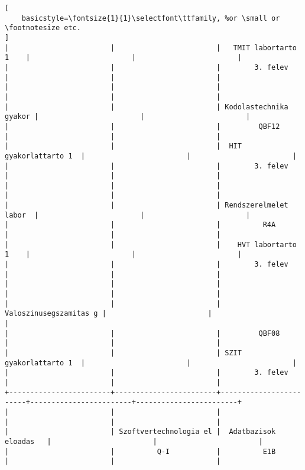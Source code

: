 \begin{lstlisting}[
    basicstyle=\fontsize{1}{1}\selectfont\ttfamily, %or \small or \footnotesize etc.
]
|                        |                        |   TMIT labortarto 1    |                        |                        | 
|                        |                        |        3. felev        |                        |                        | 
|                        |                        |                        |                        |                        | 
|                        |                        | Kodolastechnika gyakor |                        |                        | 
|                        |                        |         QBF12          |                        |                        | 
|                        |                        |  HIT gyakorlattarto 1  |                        |                        | 
|                        |                        |        3. felev        |                        |                        | 
|                        |                        |                        |                        |                        | 
|                        |                        | Rendszerelmelet labor  |                        |                        | 
|                        |                        |          R4A           |                        |                        | 
|                        |                        |    HVT labortarto 1    |                        |                        | 
|                        |                        |        3. felev        |                        |                        | 
|                        |                        |                        |                        |                        | 
|                        |                        | Valoszinusegszamitas g |                        |                        | 
|                        |                        |         QBF08          |                        |                        | 
|                        |                        | SZIT gyakorlattarto 1  |                        |                        | 
|                        |                        |        3. felev        |                        |                        | 
+------------------------+------------------------+------------------------+------------------------+------------------------+
|                        |                        |                        |                        |                        | 
|                        | Szoftvertechnologia el |  Adatbazisok eloadas   |                        |                        | 
|                        |          Q-I           |          E1B           |                        |                        | 

\end{lstlisting}
